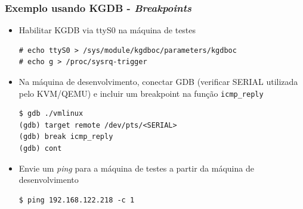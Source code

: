 \documentclass[xcolor=pdftex,dvipsnames,table]{beamer}
\begin{document}
\begin{frame}[fragile]
       \frametitle{Exemplo usando KGDB - \textit{Breakpoints}}
        \begin{center}
	\begin{itemize}
		\item Habilitar KGDB via ttyS0 na máquina de testes
		\tiny
		\begin{verbatim}
# echo ttyS0 > /sys/module/kgdboc/parameters/kgdboc
# echo g > /proc/sysrq-trigger
		\end{verbatim}
		\normalsize
		\item Na máquina de desenvolvimento, conectar GDB (verificar SERIAL utilizada pelo KVM/QEMU) e incluir um breakpoint na função {\tt icmp\_reply}
		\tiny
		\begin{verbatim}
$ gdb ./vmlinux
(gdb) target remote /dev/pts/<SERIAL>
(gdb) break icmp_reply
(gdb) cont
		\end{verbatim}
		\normalsize
		\item Envie um \textit{ping} para a máquina de testes a partir da máquina de desenvolvimento
		\tiny
		\begin{verbatim}
$ ping 192.168.122.218 -c 1
		\end{verbatim}
		\normalsize
	\end{itemize}
        \end{center}
\end{frame}
\end{document}
